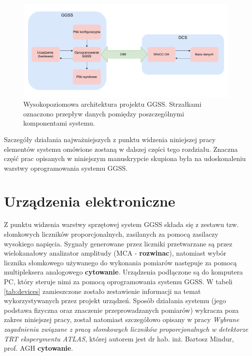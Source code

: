 \begin{figure}[H]
\centering
\includegraphics[width=\textwidth]{components/ggss_images/high_level_architecture.pdf}
\caption{Wysokopoziomowa architektura projektu GGSS. Strzałkami oznaczono przepływ danych pomiędzy poszczególnymi komponentami systemu.}
\label{fig:high_level_architecture}
\end{figure}


Szczegóły działania najważniejszych z punktu widzenia niniejszej pracy elementów systemu omówione zostaną w dalszej części tego rozdziału. Znaczna część prac opisanych w niniejszym manuskrypcie skupiona była na udoskonaleniu warstwy oprogramowania systemu GGSS.


\section{Urządzenia elektroniczne}
Z punktu widzenia warstwy sprzętowej system GGSS składa się z zestawu tzw. słomkowych liczników proporcjonalnych, zasilanych za pomocą zasilaczy wysokiego napięcia. Sygnały generowane przez liczniki przetwarzane są przez wielokanałowy analizator amplitudy (MCA - \textbf{rozwinac}), natomiast wybór licznika słomkowego używanego do wykonania pomiarów następuje za pomocą multipleksera analogowego \textbf{cytowanie}. Urządzenia podłączone są do komputera PC, który steruje nimi za pomocą oprogramowania systemu GGSS. W tabeli \ref{tab:devices} zamieszczone zostało zestawienie informacji na temat wykorzystywanych przez projekt urządzeń. Sposób działania systemu (jego podstawa fizyczna oraz znaczenie przeprowadzanych pomiarów) wykracza poza zakres niniejszej pracy, został natomiast szczegółowo opisany w pracy \emph{Wybrane zagadnienia związane z pracą słomkowych liczników proporcjonalnych w detektorze TRT eksperymentu ATLAS}, której autorem jest dr hab. inż. Bartosz Mindur, prof. AGH \textbf{cytowanie}.

\clearpage

